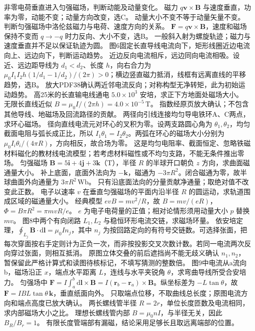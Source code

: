 \problemtext 非零电荷垂直进入匀强磁场，判断动能及动量变化。
\workings 磁力 $q\bm v\times\bm B$ 与速度垂直，功率为零，动能不变；动量方向改变，选C。
\crosscheck 动量大小不变不等于动量矢量不变。
\problemtext 判断匀强磁场中洛伦兹磁力与电荷、速度方向的关系。
\workings $\bm F=q\bm v\times\bm B$，速度和磁场保持不变而 $q\to-q$ 时力反向、大小不变，选B。
\crosscheck 一般斜入射为螺旋轨迹；磁力与速度垂直并不足以保证轨迹为圆。
\problemtext 图6固定长直导线电流向下，矩形线圈近边电流向上、远边向下，判断运动趋势。
\workings 近边反向电流相斥，远边同向电流相吸。设近、远边距导线为 $d_1<d_2$、长度 $h$，向右合力为 $\mu_0 I_1I_2h(1/d_1-1/d_2)/(2\pi)>0$；横边竖直磁力抵消，线框有远离直线的平移趋势，选B。
\crosscheck 放大PDF38确认两近邻电流反向；对称构型无净转矩，此为初始运动趋势。
\problemtext 高25米的长直输电线通电 $5.0\times10^3$ 安培，求正下方地面处磁场大小。
\workings 无限长直线近似 $B=\mu_0 I/(2\pi h)=4.0\times10^{-5}\,\mathrm T$。
\crosscheck 指数经原页放大确认；不包含其他导线、地磁场及回流路径的贡献。
\problemtext 两径向引线连接均匀导电铁环A、C两点，求环心磁场。
\workings 径向直线电流元对环心的叉积为零。设两支路圆心角为 $\theta_1,\theta_2$，均匀截面电阻与弧长成正比，所以 $I_1\theta_1=I_2\theta_2$。两弧在环心的磁场大小分别为 $\mu_0I_i\theta_i/(4\pi R)$，方向相反，故合场为零。
\crosscheck 这是均匀电阻率、截面恒定、忽略铁磁材料磁化的教材线电流模型；若考虑材料磁性或不均匀支路，不能无条件推出零场。
\problemtext 匀强磁场 $\bm B=5\bm i+4\bm j+3\bm k$（T），半径 $R$ 的半球开口朝负 $z$ 方向，求曲面磁通量大小。
\workings 补上底面，底面外法向为 $-\bm k$，磁通为 $-3\pi R^2$。闭合磁通为零，故半球曲面外向通量为 $3\pi R^2\,\mathrm{Wb}$。
\crosscheck 只有沿底面法向的分量贡献净通量；取绝对值不改变此正数。
\problemtext 电子以速率 $v$ 在垂直匀强磁场的平面内沿半径 $R$ 的圆运动，求轨道围成区域的磁通量大小。
\workings 经典模型 $evB=mv^2/R$，故 $B=mv/(eR)$，$\Phi=B\pi R^2=\pi mvR/e$。
\crosscheck $e$ 为电子电荷量的正值；相对论情形须用动量大小 $p$ 替换 $mv$。
\problemtext 图8中两个有向闭路 $L_1,L_2$ 与稳恒环形电流交链，求磁场环量。
\workings 依安培定理，$\oint_{L_j}\bm B\cdot\mathrm d\bm l=\mu_0 I n_j$，其中 $n_j$ 为按回路定向的有符号交链数。可选择张面，把每次穿面按右手定则计为正负一次，而非按投影交叉次数计数。若同一电流两次反向穿过张面，则相互抵消。
\crosscheck 原图立体交叠的前后遮挡尚不能无歧义确认 $n_1,n_2$，暂保留此严格计算式和读图待核标记，不填写猜测的整数倍。
\problemtext 图9中电流从a流向b，磁场沿正 $x$，端点水平距离 $L$，连线与水平夹锐角 $\theta$，求弯曲导线所受合安培力。
\workings 匀强场中 $\bm F=I\int_a^b\mathrm d\bm l\times\bm B=I(\bm r_b-\bm r_a)\times\bm B$。纵坐标差为 $-L\tan\theta$，故 $\bm F=IBL\tan\theta\,\bm k$，垂直纸面向外。
\crosscheck 只取端点位移，不取曲线总长度；原图电流方向和端点高度已放大确认。
\problemtext 两长螺线管半径 $R=2r$，单位长度匝数及电流相同，求内部磁场大小之比。
\workings 理想长螺线管内部 $B=\mu_0 nI$，与半径无关，因此 $B_R/B_r=1$。
\crosscheck 有限长度管端部有漏磁，结论采用足够长且取远离端部的位置。

